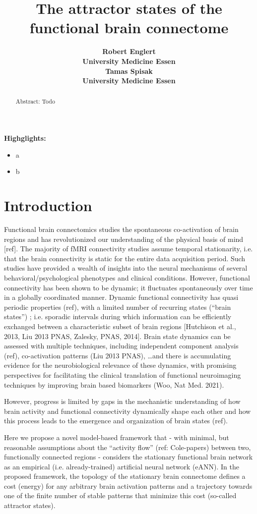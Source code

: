 \documentclass{article}
\title{The attractor states of the functional brain connectome}
\date{\displaydate{articleDate}}
\author{\bfseries Robert Englert\mdseries\\University Medicine Essen\\\AND\bfseries Tamas Spisak\mdseries\\University Medicine Essen\\}
\begin{document}
\maketitle
\begin{abstract}
Abstract: Todo
\end{abstract}\keywords{}\textbf{Highglights:}

\begin{itemize}
\item a
\item b
\end{itemize}

\section{Introduction}\label{Introduction}

Functional brain connectomics studies the spontaneous co-activation of brain regions and has revolutionized our understanding of the physical basis of mind [ref]. The majority of fMRI connectivity studies assume temporal stationarity, i.e. that the brain connectivity is static for the entire data acquisition period. Such studies have provided a wealth of insights into the neural mechanisms of several behavioral/psychological phenotypes and clinical conditions. However, functional connectivity has been shown to be dynamic; it fluctuates spontaneously over time in a globally coordinated manner. Dynamic functional connectivity has quasi periodic properties (ref), with a limited number of recurring states (``brain states'') \cite{Gutierrez_Barragan_2019}; i.e. sporadic intervals during which information can be efficiently exchanged between a characteristic subset of brain regions [Hutchison et al., 2013, Liu 2013 PNAS, Zalesky, PNAS, 2014]. Brain state dynamics can be assessed with multiple techniques, including independent component analysis (ref), co-activation patterns (Liu 2013 PNAS), \dots and there is accumulating evidence for the neurobiological relevance of these dynamics, with promising perspectives for facilitating the clinical translation of functional neuroimaging techniques by improving brain based biomarkers (Woo, Nat Med. 2021).

However, progress is limited by gaps in the mechanistic understanding of how brain activity and functional connectivity dynamically shape each other and how this process leads to the emergence and organization of brain states (ref).

Here we propose a novel model-based framework that - with minimal, but reasonable assumptions about the ``activity flow'' (ref: Cole-papers) between two, functionally connected regions - considers the stationary functional brain network as an empirical (i.e. already-trained) artificial neural network (eANN). In the proposed framework, the topology of the stationary brain connectome defines a cost (energy) for any arbitrary brain activation patterns and a trajectory towards one of the finite number of stable patterns that minimize this cost (so-called attractor states).
\end{document}
